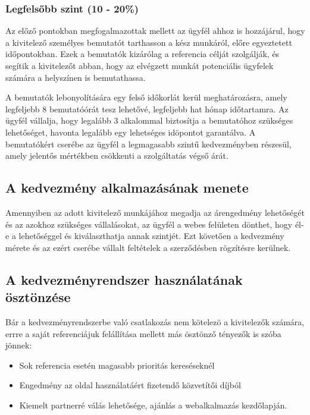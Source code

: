 \subsubsection{Legfelsőbb szint (10 - 20\%)}
Az előző pontokban megfogalmazottak mellett az ügyfél ahhoz is hozzájárul, hogy a kivitelező személyes bemutatót tarthasson a kész munkáról, előre egyeztetett időpontokban. Ezek a bemutatók kizárólag a referencia célját szolgálják, és segítik a kivitelezőt abban, hogy az elvégzett munkát potenciális ügyfelek számára a helyszínen is bemutathassa.

A bemutatók lebonyolítására egy felső időkorlát kerül meghatározásra, amely legfeljebb 8 bemutatóórát tesz lehetővé, legfeljebb hat hónap időtartamra. Az ügyfél vállalja, hogy legalább 3 alkalommal biztosítja a bemutatóhoz szükséges lehetőséget, havonta legalább egy lehetséges idöpontot garantálva. A bemutatókért cserébe az ügyfél a legmagasabb szintű kedvezményben részesül, amely jelentős mértékben csökkenti a szolgáltatás végső árát. 

\subsection{A kedvezmény alkalmazásának menete}
Amennyiben az adott kivitelező munkájához megadja az árengedmény lehetőségét és az azokhoz szükséges vállalásokat,
az ügyfél a webes felületen dönthet, hogy él-e a lehetőséggel és kiválaszthatja annak szintjét.
Ezt követően a kedvezmény mérete és az ezért cserébe vállalt feltételek a szerződésben rögzítésre kerülnek.

\subsection{A kedvezményrendszer használatának ösztönzése}
Bár a kedvezményrendszerbe való csatlakozás nem kötelezö a kivitelezők számára, errre a saját referenciájuk felállítása mellett más ösztönző tényezők is szóba jönnek:
\begin{itemize}
\item Sok referencia esetén magasabb prioritás kereséseknél
\item Engedmény az oldal használatáért fizetendő közvetítői díjból
\item Kiemelt partnerré válás lehetősége, ajánlás a webalkalmazás kezdőlapján. 
\end{itemize} 